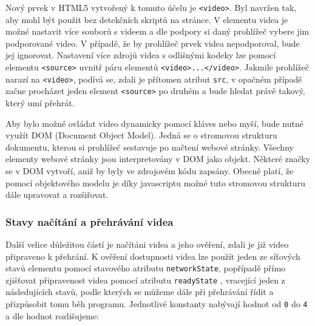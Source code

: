 Nový prvek v HTML5 vytvořený k tomuto účelu je \texttt{<video>}. Byl navržen tak, aby mohl být použit bez detekčních skriptů na stránce. V elementu videa je možné nastavit více souborů s videem a dle podpory si daný prohlížeč vybere jim podporované video. V případě, že by prohlížeč prvek videa nepodporoval, bude jej ignorovat. Nastavení více zdrojů videa s odlišnými kodeky lze pomocí elementu \texttt{<source>} uvnitř páru elementů \texttt{<video>...</video>}. Jakmile prohlížeč narazí na \texttt{<video>}, podívá se, zdali je přítomen atribut \texttt{src}, v opačném případě začne procházet jeden element \texttt{<source>} po druhém a bude hledat právě takový, který umí přehrát.

Aby bylo možné ovládat video dynamicky pomocí kláves nebo myší, bude nutné využít DOM (Document Object Model). Jedná se o stromovou strukturu dokumentu, kterou si prohlížeč sestavuje po načtení webové stránky. Všechny elementy webové stránky jsou interpretovány v DOM jako objekt. Některé značky se v DOM vytvoří, aniž by byly ve zdrojovém kódu zapsány. Obecně platí, že pomocí objektového modelu je díky javascriptu možné tuto stromovou strukturu dále upravovat a rozšiřovat. 



\subsubsection{Stavy načítání a přehrávání videa}
Další velice důležitou částí je načítáni videa a jeho ověření, zdali  je již video připraveno k přehrání. K ověření dostupnosti videa lze použít jeden ze síťových stavů elementu pomocí stavového atributu \texttt{networkState}, popřípadě přímo zjišťovat připravenost videa pomocí atributu \texttt{readyState} \cite{html5}, vracející jeden z následujících stavů, podle kterých se můžeme dále při přehrávání řídit a přizpůsobit tomu běh programu. Jednotlivé konstanty nabývají hodnot od \texttt{0} do \texttt{4} a dle hodnot rozlišujeme:


